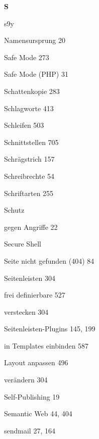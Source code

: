 \documentclass{book}
\renewcommand\indexspace{\vspace{11pt}}
\renewcommand\subitem{\par}
\begin{document}
\begin{multicols}{2}
\begin{osp-index}
  \indexspace
{\sffamily\bfseries S}\nopagebreak

  \item s9y
    \subitem Namensursprung\hspace{1mm} 20
  \item Safe Mode\hspace{1mm} 273
  \item Safe Mode (PHP)\hspace{1mm} 31
  \item Schattenkopie\hspace{1mm} 283
  \item Schlagworte\hspace{1mm} 413
  \item Schleifen\hspace{1mm} 503
  \item Schnittstellen\hspace{1mm} 705
  \item Schr\"agstrich\hspace{1mm} 157
  \item Schreibrechte\hspace{1mm} 54
  \item Schriftarten\hspace{1mm} 255
  \item Schutz
    \subitem gegen Angriffe\hspace{1mm} 22
  \item Secure Shell\hspace{1mm} 
  \item Seite nicht gefunden (404)\hspace{1mm} 84
  \item Seitenleisten\hspace{1mm} 304
    \subitem frei definierbare\hspace{1mm} 527
    \subitem verstecken\hspace{1mm} 304
  \item Seitenleisten-Plugins\hspace{1mm} 145, 199
    \subitem in Templates einbinden\hspace{1mm} 587
    \subitem Layout anpassen\hspace{1mm} 496
    \subitem ver\"andern\hspace{1mm} 304
  \item Self-Publishing\hspace{1mm} 19
  \item Semantic Web\hspace{1mm} 44, 404
  \item sendmail\hspace{1mm} 27, 164

\end{osp-index}
\end{multicols}
\end{document}
